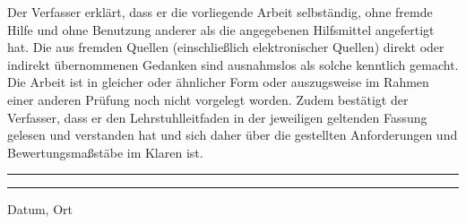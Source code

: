 Der Verfasser erklärt, dass er die vorliegende Arbeit selbständig, ohne fremde Hilfe und ohne Benutzung anderer als die angegebenen Hilfsmittel angefertigt hat. Die aus fremden Quellen (einschließlich elektronischer Quellen) direkt oder indirekt übernommenen Gedanken sind ausnahmslos als solche kenntlich gemacht. Die Arbeit ist in gleicher oder ähnlicher Form oder auszugsweise im Rahmen einer anderen Prüfung noch nicht vorgelegt worden. Zudem bestätigt der Verfasser, dass er den Lehrstuhlleitfaden in der jeweiligen geltenden Fassung gelesen und verstanden hat und sich daher über die gestellten Anforderungen und Bewertungsmaßstäbe im Klaren ist. \\[4cm]
\noindent\rule{5cm}{.4pt}\hfill\rule{5cm}{.4pt}\par
\noindent Datum, Ort \hfill \autor \\
